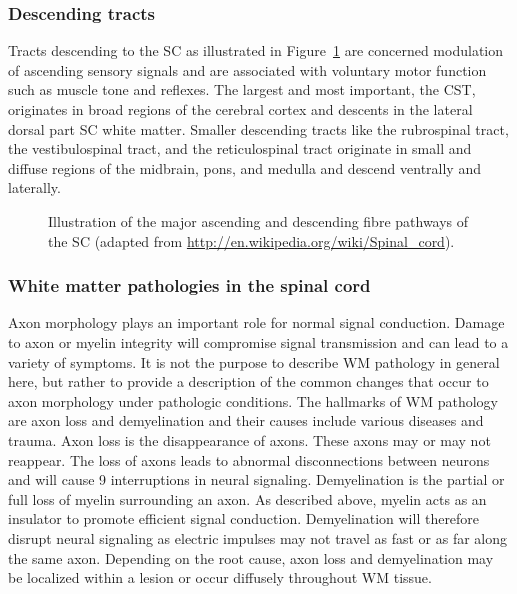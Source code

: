 \subsubsection*{Descending tracts}
\label{sec:chap2:descendingtracts}
Tracts descending to the {\gls{SC}} as illustrated in Figure~\ref{fig:chapter 2 spinal_cord_anatomy} are concerned modulation of ascending sensory signals and are associated with voluntary motor function such as muscle tone and reflexes. The largest and most important, the {\gls{CST}}, originates in broad regions of the cerebral cortex and descents in the lateral dorsal part {\gls{SC}} white matter. Smaller descending tracts like the rubrospinal tract, the vestibulospinal tract, and the reticulospinal tract originate in small and diffuse regions of the midbrain, pons, and medulla and descend ventrally and laterally.
\begin{figure}
 \centering
  \caption{Illustration of the major ascending and descending fibre pathways of the {\protect\gls{SC}} (adapted from \url{http://en.wikipedia.org/wiki/Spinal_cord}).}
  \label{fig:chapter 2 spinal_cord_anatomy}
\end{figure}
\subsubsection*{White matter pathologies in the spinal cord}
Axon morphology plays an important role for normal signal conduction. Damage to axon or myelin integrity will compromise signal transmission and can lead to a variety of symptoms. It is not the purpose to describe WM pathology in general here, but rather to provide a description of the common changes that occur to axon morphology under pathologic conditions. The hallmarks of WM pathology are axon loss and demyelination and their causes include various diseases and trauma. Axon loss is the disappearance of axons. These axons may or may not reappear.
The loss of axons leads to abnormal disconnections between neurons and will cause 9 interruptions in neural signaling. Demyelination is the partial or full loss of myelin surrounding an axon. As described above, myelin acts as an insulator to promote efficient signal conduction. Demyelination will therefore disrupt neural signaling as electric impulses may not travel as fast or as far along the same axon. Depending on the root cause, axon loss and demyelination may be localized within a lesion or occur diffusely
throughout WM tissue.

